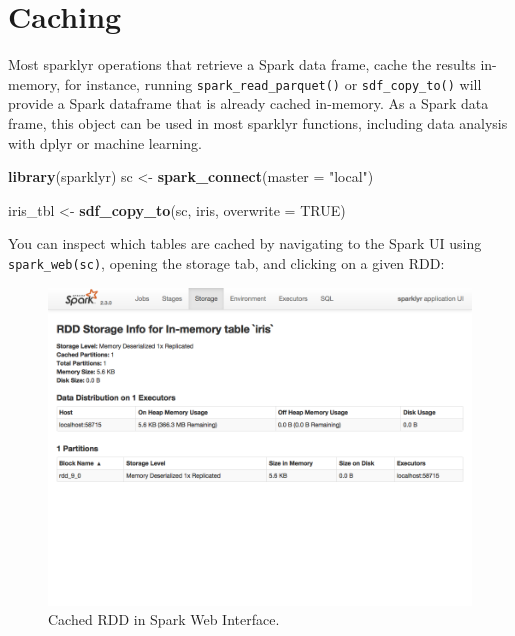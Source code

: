 \documentclass[]{book}
\newenvironment{Shaded}{\begin{snugshade}}{\end{snugshade}}
\newcommand{\DataTypeTok}[1]{\textcolor[rgb]{0.13,0.29,0.53}{#1}}
\newcommand{\KeywordTok}[1]{\textcolor[rgb]{0.13,0.29,0.53}{\textbf{#1}}}
\newcommand{\NormalTok}[1]{#1}
\newcommand{\OtherTok}[1]{\textcolor[rgb]{0.56,0.35,0.01}{#1}}
\newcommand{\StringTok}[1]{\textcolor[rgb]{0.31,0.60,0.02}{#1}}
\theoremstyle{definition}
\theoremstyle{definition}
\theoremstyle{definition}
\theoremstyle{remark}
\begin{document}
\hypertarget{caching}{%
\section{Caching}\label{caching}}

Most sparklyr operations that retrieve a Spark data frame, cache the
results in-memory, for instance, running \texttt{spark\_read\_parquet()}
or \texttt{sdf\_copy\_to()} will provide a Spark dataframe that is
already cached in-memory. As a Spark data frame, this object can be used
in most sparklyr functions, including data analysis with dplyr or
machine learning.

\begin{Shaded}
\begin{Highlighting}[]
\KeywordTok{library}\NormalTok{(sparklyr)}
\NormalTok{sc <-}\StringTok{ }\KeywordTok{spark_connect}\NormalTok{(}\DataTypeTok{master =} \StringTok{"local"}\NormalTok{)}
\end{Highlighting}
\end{Shaded}

\begin{Shaded}
\begin{Highlighting}[]
\NormalTok{iris_tbl <-}\StringTok{ }\KeywordTok{sdf_copy_to}\NormalTok{(sc, iris, }\DataTypeTok{overwrite =} \OtherTok{TRUE}\NormalTok{)}
\end{Highlighting}
\end{Shaded}

You can inspect which tables are cached by navigating to the Spark UI
using \texttt{spark\_web(sc)}, opening the storage tab, and clicking on
a given RDD:

\begin{figure}

{\centering \includegraphics[width=13.78in]{images/07-tuning-cache-rdd-web} 

}

\caption{Cached RDD in Spark Web Interface.}\label{fig:spark-standalone-rdd-web}
\end{figure}
\end{document}

